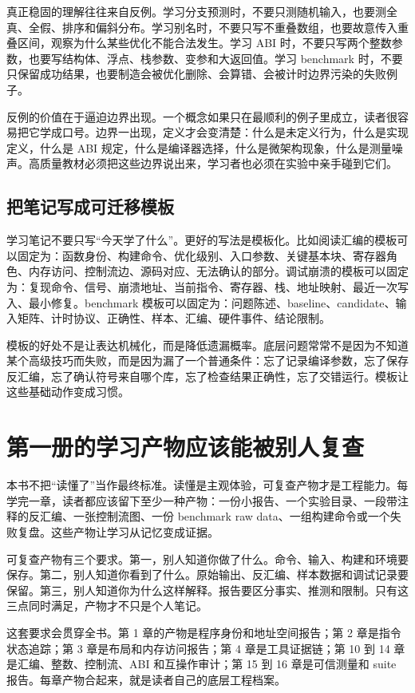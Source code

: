 真正稳固的理解往往来自反例。学习分支预测时，不要只测随机输入，也要测全真、全假、排序和偏斜分布。学习别名时，不要只写不重叠数组，也要故意传入重叠区间，观察为什么某些优化不能合法发生。学习 ABI 时，不要只写两个整数参数，也要写结构体、浮点、栈参数、变参和大返回值。学习 benchmark 时，不要只保留成功结果，也要制造会被优化删除、会算错、会被计时边界污染的失败例子。

反例的价值在于逼迫边界出现。一个概念如果只在最顺利的例子里成立，读者很容易把它学成口号。边界一出现，定义才会变清楚：什么是未定义行为，什么是实现定义，什么是 ABI 规定，什么是编译器选择，什么是微架构现象，什么是测量噪声。高质量教材必须把这些边界说出来，学习者也必须在实验中亲手碰到它们。

\subsection{把笔记写成可迁移模板}

学习笔记不要只写“今天学了什么”。更好的写法是模板化。比如阅读汇编的模板可以固定为：函数身份、构建命令、优化级别、入口参数、关键基本块、寄存器角色、内存访问、控制流边、源码对应、无法确认的部分。调试崩溃的模板可以固定为：复现命令、信号、崩溃地址、当前指令、寄存器、栈、地址映射、最近一次写入、最小修复。benchmark 模板可以固定为：问题陈述、baseline、candidate、输入矩阵、计时协议、正确性、样本、汇编、硬件事件、结论限制。

模板的好处不是让表达机械化，而是降低遗漏概率。底层问题常常不是因为不知道某个高级技巧而失败，而是因为漏了一个普通条件：忘了记录编译参数，忘了保存反汇编，忘了确认符号来自哪个库，忘了检查结果正确性，忘了交错运行。模板让这些基础动作变成习惯。

\section{第一册的学习产物应该能被别人复查}

本书不把“读懂了”当作最终标准。读懂是主观体验，可复查产物才是工程能力。每学完一章，读者都应该留下至少一种产物：一份小报告、一个实验目录、一段带注释的反汇编、一张控制流图、一份 benchmark raw data、一组构建命令或一个失败复盘。这些产物让学习从记忆变成证据。

可复查产物有三个要求。第一，别人知道你做了什么。命令、输入、构建和环境要保存。第二，别人知道你看到了什么。原始输出、反汇编、样本数据和调试记录要保留。第三，别人知道你为什么这样解释。报告要区分事实、推测和限制。只有这三点同时满足，产物才不只是个人笔记。

这套要求会贯穿全书。第 1 章的产物是程序身份和地址空间报告；第 2 章是指令状态追踪；第 3 章是布局和内存访问报告；第 4 章是工具证据链；第 10 到 14 章是汇编、整数、控制流、ABI 和互操作审计；第 15 到 16 章是可信测量和 suite 报告。每章产物合起来，就是读者自己的底层工程档案。

